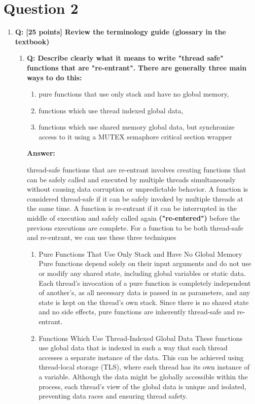 \documentclass[a4paper,11pt]{article}%
\newenvironment{qanda}{\setlength{\parindent}{0pt}}{\bigskip}
\newcommand{\Q}{\bigskip\bfseries Q: }
\newcommand{\A}{\par\textbf{Answer: } \normalfont}
\begin{document}
\begin{qanda}
	\section{Question 2}
	\begin{enumerate}
		\item[] \Q [25 points] Review the terminology guide (glossary in the textbook)
			\begin{enumerate}
				\item \Q Describe clearly what it means to write "thread safe" functions that are "re-entrant".
				      There are generally three main ways to do this:\\
				      \begin{enumerate}
					      \item pure functions that use only stack and have no global memory,
					      \item functions which use thread indexed global data,
					      \item functions which use shared memory global data, but synchronize access to it using a
					            MUTEX semaphore critical section wrapper
				      \end{enumerate}
				      \A

				      thread-safe functions that are re-entrant involves creating functions that can be safely called and executed by multiple threads simultaneously without causing data corruption or unpredictable behavior. A function is considered thread-safe if it can be safely invoked by multiple threads at the same time. A function is re-entrant if it can be interrupted in the middle of execution and safely called again \textbf{("re-entered")} before the previous executions are complete. For a function to be both thread-safe and re-entrant, we can use these three techniques
				      \begin{enumerate}
					      \item Pure Functions That Use Only Stack and Have No Global Memory
					            Pure functions depend solely on their input arguments and do not use or modify any shared state, including global variables or static data. Each thread's invocation of a pure function is completely independent of another's, as all necessary data is passed in as parameters, and any state is kept on the thread's own stack. Since there is no shared state and no side effects, pure functions are inherently thread-safe and re-entrant.

					      \item  Functions Which Use Thread-Indexed Global Data
					            These functions use global data that is indexed in such a way that each thread accesses a separate instance of the data. This can be achieved using thread-local storage (TLS), where each thread has its own instance of a variable. Although the data might be globally accessible within the process, each thread's view of the global data is unique and isolated, preventing data races and ensuring thread safety.



\end{enumerate}
\end{enumerate}
\end{enumerate}
\end{qanda}
\end{document}
